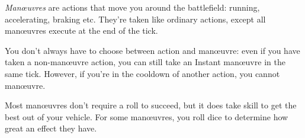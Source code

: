 
\emph{Man\oe{}uvres} are actions that move you around the battlefield: running, accelerating, braking etc. They're taken like ordinary actions, except all man\oe{}uvres execute at the end of the tick.

You don't always have to choose between action and man\oe{}uvre: even if you have taken a non-man\oe{}uvre action, you can still take an Instant man\oe{}uvre in the same tick. However, if you're in the cooldown of another action, you cannot man\oe{}uvre.

Most man\oe{}uvres don't require a roll to succeed, but it does take skill to get the best out of your vehicle. For some man\oe{}uvres, you roll dice to determine how great an effect they have.
